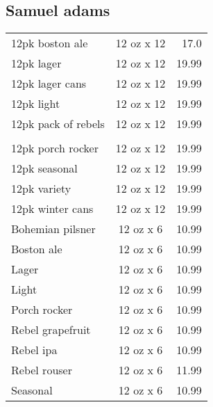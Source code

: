 \documentclass{article}%
\begin{document}
\begin{multicols}{3}
%
\subsection*{Samuel adams}%
\begin{tabular}{>{\raggedright}p{16ex\hangindent=3ex} c r}%
12pk boston ale&12 oz x 12&17.0\\%
12pk lager&12 oz x 12&19.99\\%
12pk lager cans&12 oz x 12&19.99\\%
12pk light&12 oz x 12&19.99\\%
12pk pack of rebels&12 oz x 12&19.99\\%
&&\\%
12pk porch rocker&12 oz x 12&19.99\\%
12pk seasonal&12 oz x 12&19.99\\%
12pk variety&12 oz x 12&19.99\\%
12pk winter cans&12 oz x 12&19.99\\%
Bohemian pilsner&12 oz x 6&10.99\\%
Boston ale&12 oz x 6&10.99\\%
Lager&12 oz x 6&10.99\\%
Light&12 oz x 6&10.99\\%
Porch rocker&12 oz x 6&10.99\\%
Rebel grapefruit&12 oz x 6&10.99\\%
Rebel ipa&12 oz x 6&10.99\\%
Rebel rouser&12 oz x 6&11.99\\%
Seasonal&12 oz x 6&10.99\\%
\end{tabular}

%
\end{multicols}%
\end{document}
